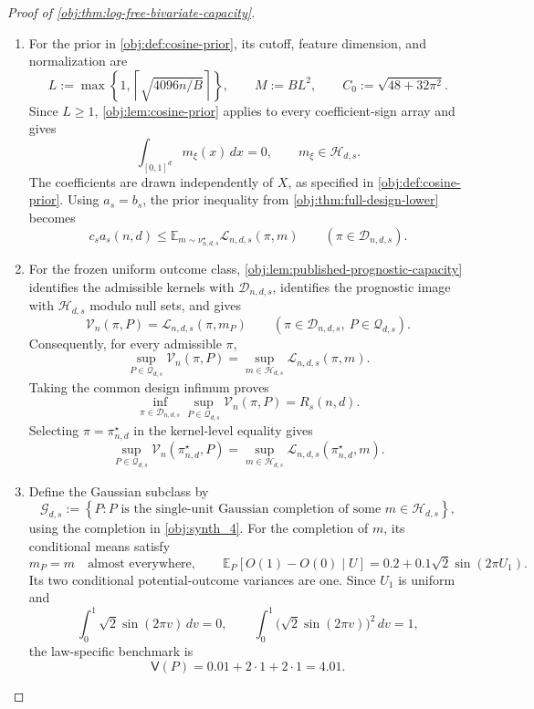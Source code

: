 \begin{proof}[Proof of \cref{obj:thm:log-free-bivariate-capacity}]
\begin{enumerate}
\item
For the prior in \cref{obj:def:cosine-prior}, its cutoff, feature dimension, and normalization are
\[
L:=\max\left\{1,\left\lceil\sqrt{4096n/B}\right\rceil\right\},
\qquad
M:=BL^2,
\qquad
C_0:=\sqrt{48+32\pi^2}.
\]
Since \(L\geq1\), \cref{obj:lem:cosine-prior} applies to every coefficient-sign array and gives
\[
\int_{[0,1]^d}m_\xi(x)\,dx=0,
\qquad
m_\xi\in\mathcal H_{d,s}.
\]
The coefficients are drawn independently of \(X\), as specified in \cref{obj:def:cosine-prior}. Using \(a_s=b_s\), the prior inequality from \cref{obj:thm:full-design-lower} becomes
\[
c_sa_s(n,d)
\leq
\mathbb E_{m\sim\nu^\star_{n,d,s}}
\mathcal L_{n,d,s}(\pi,m)
\qquad(\pi\in\mathcal D_{n,d,s}).
\]

\item
For the frozen uniform outcome class, \cref{obj:lem:published-prognostic-capacity} identifies the admissible kernels with \(\mathcal D_{n,d,s}\), identifies the prognostic image with \(\mathcal H_{d,s}\) modulo null sets, and gives
\[
\mathcal V_n(\pi,P)
=
\mathcal L_{n,d,s}(\pi,m_P)
\qquad
(\pi\in\mathcal D_{n,d,s},\ P\in\mathcal Q_{d,s}).
\]
Consequently, for every admissible \(\pi\),
\[
\sup_{P\in\mathcal Q_{d,s}}\mathcal V_n(\pi,P)
=
\sup_{m\in\mathcal H_{d,s}}\mathcal L_{n,d,s}(\pi,m).
\]
Taking the common design infimum proves
\[
\inf_{\pi\in\mathcal D_{n,d,s}}
\sup_{P\in\mathcal Q_{d,s}}\mathcal V_n(\pi,P)
=
R_s(n,d).
\]
Selecting \(\pi=\pi^\star_{n,d}\) in the kernel-level equality gives
\[
\sup_{P\in\mathcal Q_{d,s}}
\mathcal V_n(\pi^\star_{n,d},P)
=
\sup_{m\in\mathcal H_{d,s}}
\mathcal L_{n,d,s}(\pi^\star_{n,d},m).
\]

\item
Define the Gaussian subclass by
\[
\mathcal G_{d,s}
:=
\left\{
P:
P\text{ is the single-unit Gaussian completion of some }
m\in\mathcal H_{d,s}
\right\},
\]
using the completion in \cref{obj:synth_4}. For the completion of \(m\), its conditional means satisfy
\[
m_P=m\quad\text{almost everywhere},
\qquad
\mathbb E_P[O(1)-O(0)\mid U]
=
0.2+0.1\sqrt2\sin(2\pi U_1).
\]
Its two conditional potential-outcome variances are one. Since \(U_1\) is uniform and
\[
\int_0^1\sqrt2\sin(2\pi v)\,dv=0,
\qquad
\int_0^1\bigl(\sqrt2\sin(2\pi v)\bigr)^2\,dv=1,
\]
the law-specific benchmark is
\[
\mathsf V(P)=0.01+2\cdot1+2\cdot1=4.01.
\]


\end{enumerate}
\end{proof}
